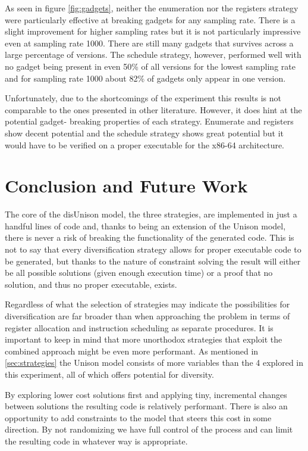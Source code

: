 As seen in figure \ref{fig:gadgets}, neither the enumeration nor the registers strategy
were particularly effective at breaking gadgets for any sampling rate. There is a slight
improvement for higher sampling rates but it is not particularly impressive even at
sampling rate 1000. There are still many gadgets that survives across a large percentage of
versions. The schedule strategy, however, performed well with no gadget being present
in even 50\% of all versions for the lowest sampling rate and for sampling rate 1000
about 82\% of gadgets only appear in one version.

Unfortunately, due to the shortcomings of the experiment this results is not comparable to
the ones presented in other literature. However, it does hint at the potential gadget-
breaking properties of each strategy. Enumerate and registers show decent potential and the
schedule strategy shows great potential but it would have to be verified on a proper
executable for the x86-64 architecture.

\section{Conclusion and Future Work}

The core of the disUnison model, the three strategies, are implemented in just a handful
lines of code and, thanks to being an extension of the Unison model, there is never a risk
of breaking the functionality of the generated code. This is not to say that every
diversification strategy allows for proper executable code to be generated, but thanks to
the nature of constraint solving the result will either be all possible solutions
(given enough execution time) or a proof that no solution, and thus no proper executable,
exists.

Regardless of what the selection of strategies may indicate the possibilities for
diversification are far broader than when approaching the problem in terms of register
allocation and instruction scheduling as separate procedures. It is important to keep in
mind that more unorthodox strategies that exploit the combined approach might be even
more performant. As mentioned in \ref{sec:strategies} the Unison model consists of more
variables than the 4 explored in this experiment, all of which offers potential for
diversity.

By exploring lower cost solutions first and applying tiny, incremental changes between
solutions the resulting code is relatively performant. There is also an opportunity to
add constraints to the model that steers this cost in some direction. By not randomizing
we have full control of the process and can limit the resulting code in whatever way is
appropriate.

